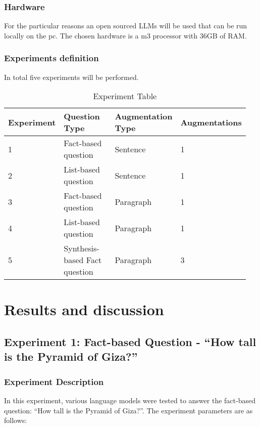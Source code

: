 \documentclass{wseas}
\begin{document}
\subsubsection{Hardware}

For the particular reasons an open sourced LLMs will be used that can be
run locally on the pc. The chosen hardware is a m3 processor with 36GB
of RAM.

\subsubsection{Experiments definition}

In total five experiments will be performed.


\begin{table*}[htbp]
\centering
\begin{tabular}{|p{0.15\linewidth}|p{0.35\linewidth}|p{0.25\linewidth}|p{0.20\linewidth}|}
\hline
\textbf{Experiment} & \textbf{Question Type} & \textbf{Augmentation Type} & \textbf{Augmentations} \\ \hline
1 & Fact-based question & Sentence & 1 \\ \hline
2 & List-based question & Sentence & 1 \\ \hline
3 & Fact-based question & Paragraph & 1 \\ \hline
4 & List-based question & Paragraph & 1 \\ \hline
5 & Synthesis-based Fact question & Paragraph & 3 \\ \hline
\end{tabular}
\caption{Experiment Table}
\end{table*}

    

\section{Results and discussion}

\subsection{Experiment 1: Fact-based Question - ``How tall is the
Pyramid of
Giza?''}

\subsubsection{Experiment Description}
In this experiment, various language models were tested to answer the
fact-based question: ``How tall is the Pyramid of Giza?''. The
experiment parameters are as follows:
\end{document}
